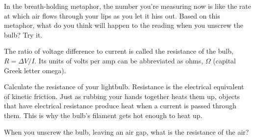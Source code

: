 In the breath-holding metaphor, the number you're measuring
now is like the rate at which air flows 
through your lips as you let it hiss out. Based on this
metaphor, what do you think will happen to the reading when
you unscrew the bulb? Try it.


The ratio of voltage difference to current is called the resistance
of the bulb, $R=\Delta V/I$. Its units of volts per amp can be
abbreviated as ohms, $\Omega$ (capital Greek letter omega).

Calculate the resistance of your lightbulb. Resistance is the
electrical equivalent of kinetic friction. Just as rubbing
your hands together heats them up, objects that have
electrical resistance produce heat when a current is passed
through them. This is why the bulb's filament gets hot enough
to heat up.

When you unscrew the bulb, leaving an air gap, what is the
resistance of the air?


